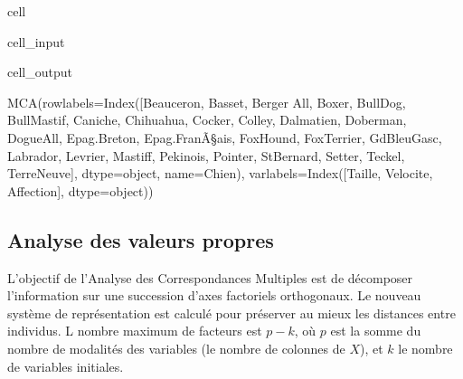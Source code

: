 \documentclass[letterpaper,10pt,french]{sphinxmanual}
\begin{document}
\begin{sphinxuseclass}{cell}
\begin{sphinxuseclass}{cell_input}
\begin{sphinxVerbatim}[commandchars=\\\{\}]
   
   
\end{sphinxVerbatim}

\end{sphinxuseclass}
\begin{sphinxuseclass}{cell_output}
\begin{sphinxVerbatim}[commandchars=\\\{\}]
MCA(row\PYGZus{}labels=Index([\PYGZsq{}Beauceron\PYGZsq{}, \PYGZsq{}Basset\PYGZsq{}, \PYGZsq{}Berger All\PYGZsq{}, \PYGZsq{}Boxer\PYGZsq{}, \PYGZsq{}Bull\PYGZhy{}Dog\PYGZsq{}, \PYGZsq{}Bull\PYGZhy{}Mastif\PYGZsq{},
       \PYGZsq{}Caniche\PYGZsq{}, \PYGZsq{}Chihuahua\PYGZsq{}, \PYGZsq{}Cocker\PYGZsq{}, \PYGZsq{}Colley\PYGZsq{}, \PYGZsq{}Dalmatien\PYGZsq{}, \PYGZsq{}Doberman\PYGZsq{},
       \PYGZsq{}Dogue\PYGZhy{}All\PYGZsq{}, \PYGZsq{}Epag.\PYGZhy{}Breton\PYGZsq{}, \PYGZsq{}Epag.\PYGZhy{}FranÃ\S{}ais\PYGZsq{}, \PYGZsq{}Fox\PYGZhy{}Hound\PYGZsq{},
       \PYGZsq{}Fox\PYGZhy{}Terrier\PYGZsq{}, \PYGZsq{}Gd\PYGZhy{}Bleu\PYGZhy{}Gasc\PYGZsq{}, \PYGZsq{}Labrador\PYGZsq{}, \PYGZsq{}Levrier\PYGZsq{}, \PYGZsq{}Mastiff\PYGZsq{},
       \PYGZsq{}Pekinois\PYGZsq{}, \PYGZsq{}Pointer\PYGZsq{}, \PYGZsq{}St\PYGZhy{}Bernard\PYGZsq{}, \PYGZsq{}Setter\PYGZsq{}, \PYGZsq{}Teckel\PYGZsq{}, \PYGZsq{}Terre\PYGZhy{}Neuve\PYGZsq{}],
      dtype=\PYGZsq{}object\PYGZsq{}, name=\PYGZsq{}Chien\PYGZsq{}),
    var\PYGZus{}labels=Index([\PYGZsq{}Taille\PYGZsq{}, \PYGZsq{}Velocite\PYGZsq{}, \PYGZsq{}Affection\PYGZsq{}], dtype=\PYGZsq{}object\PYGZsq{}))
\end{sphinxVerbatim}

\end{sphinxuseclass}
\end{sphinxuseclass}

\subsection{Analyse des valeurs propres}
\label{\detokenize{TP3_AFC_ACM:analyse-des-valeurs-propres}}
\sphinxAtStartPar
L’objectif de l’Analyse des Correspondances Multiples est de décomposer l’information sur une succession d’axes factoriels orthogonaux. Le nouveau système de représentation est calculé pour préserver au mieux les distances entre individus. L nombre maximum de facteurs est \(p-k\), où \(p\) est la somme du nombre de modalités des variables (le nombre de colonnes de \(X\)), et \(k\) le nombre de variables initiales.
\end{document}
